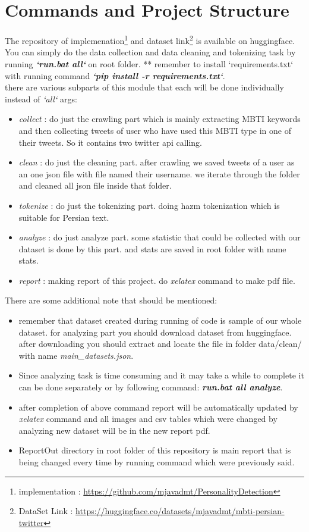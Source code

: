 \documentclass[10pt, a4paper]{article}
\begin{document}
\section{Commands and Project Structure}
The repository of implemenation\footnote{implementation : \url{https://github.com/mjavadmt/PersonalityDetection}} and dataset link\footnote{DataSet Link : \url{https://huggingface.co/datasets/mjavadmt/mbti-persian-twitter}} is available on huggingface. You can simply do the data collection and data cleaning and tokenizing task by running \textbf{\textit{`run.bat all`}} on root folder.
\newline
** remember to install `requirements.txt` with running command \textbf{\textit{`pip install -r requirements.txt`}}.
\\
there are various subparts of this module that each will be done individually instead of \textit{`all`} args:
\begin{itemize}
    \item \textit{collect} : do just the crawling part which is mainly extracting MBTI keywords and then collecting tweets of user who have used this MBTI type in one of their tweets. So it contains two twitter api calling.
    \item \textit{clean} : do just the cleaning part. after crawling we saved tweets of a user as an one json file with file named their username. we iterate through the folder and cleaned all json file inside that folder.
    \item \textit{tokenize} : do just the tokenizing part. doing hazm tokenization which is suitable for Persian text.
    \item \textit{analyze} : do just analyze part. some statistic that could be collected with our dataset is done by this part. and stats are saved in root folder with name stats.
    \item \textit{report} : making report of this project. do \textit{xelatex} command to make pdf file.
\end{itemize}

\vspace{1cm}
There are some additional note that should be mentioned:
\begin{itemize}
    \item remember that dataset created during running of code is sample of our whole dataset. for analyzing part you should download
          dataset from huggingface. after downloading you should extract and locate the file in folder data/clean/ with name \textit{main\_datasets.json}.
    \item Since analyzing task is time consuming and it may take a while to complete it can be done separately or by following command:
          \textbf{\textit{run.bat all analyze}}.
    \item after completion of above command report will be automatically updated by \textit{xelatex} command and all images and csv tables which were changed by analyzing new dataset will be in the new report pdf.
    \item ReportOut directory in root folder of this repository is main report that is being changed every time by running command which were previously said.
\end{itemize}
\end{document}
